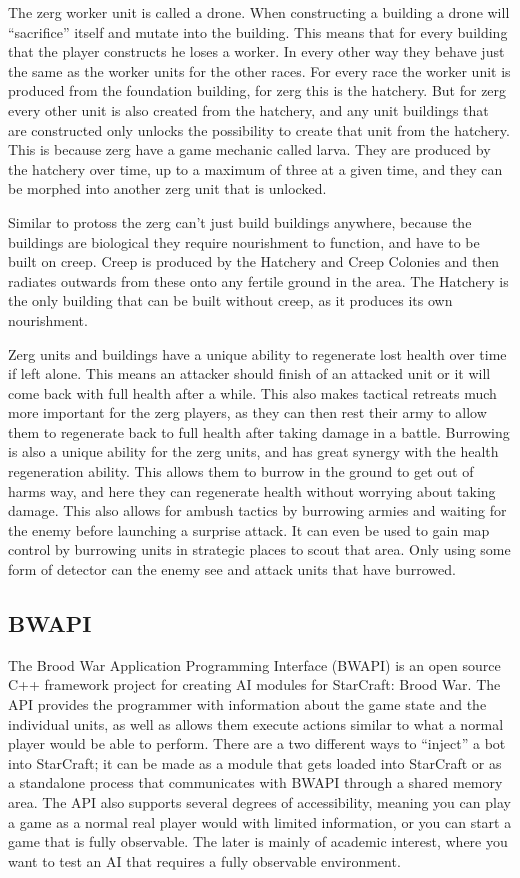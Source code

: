 The zerg worker unit is called a drone. When constructing a building a drone
will ``sacrifice'' itself and mutate into the building. This means that for
every building that the player constructs he loses a worker. In every other way
they behave just the same as the worker units for the other races. For every
race the worker unit is produced from the foundation building, for zerg this is
the hatchery. But for zerg every other unit is also created from the hatchery,
and any unit buildings that are constructed only unlocks the possibility to
create that unit from the hatchery. This is because zerg have a game mechanic
called larva. They are produced by the hatchery over time, up to a maximum of
three at a given time, and they can be morphed into another zerg unit that is
unlocked. 

Similar to protoss the zerg can't just build buildings anywhere, because the
buildings are biological they require nourishment to function, and have to be
built on creep. Creep is produced by the Hatchery and Creep Colonies and then
radiates outwards from these onto any fertile ground in the area. The Hatchery
is the only building that can be built without creep, as it produces its own
nourishment. 

Zerg units and buildings have a unique ability to regenerate lost health over
time if left alone. This means an attacker should finish of an attacked unit or
it will come back with full health after a while. This also makes tactical
retreats much more important for the zerg players, as they can then rest their
army to allow them to regenerate back to full health after taking damage in a
battle. Burrowing is also a unique ability for the zerg units, and has great
synergy with the health regeneration ability. This allows them to burrow in the
ground to get out of harms way, and here they can regenerate health without
worrying about taking damage. This also allows for ambush tactics by burrowing
armies and waiting for the enemy before launching a surprise attack. It can even
be used to gain map control by burrowing units in strategic places to scout that
area. Only using some form of detector can the enemy see and attack units that
have burrowed. 

\subsection{BWAPI}
The Brood War Application Programming Interface (BWAPI) is an open source C++
framework project for creating AI modules for StarCraft: Brood War. The API
provides the programmer with information about the game state and the individual
units, as well as allows them execute actions similar to what a normal player
would be able to perform. There are a two different ways to ``inject'' a bot
into StarCraft; it can be made as a module that gets loaded into StarCraft or as
a standalone process that communicates with BWAPI through a shared memory area.
The API also supports several degrees of accessibility, meaning you can play a
game as a normal real player would with limited information, or you can start a
game that is fully observable. The later is mainly of academic interest, where
you want to test an AI that requires a fully observable environment.  
